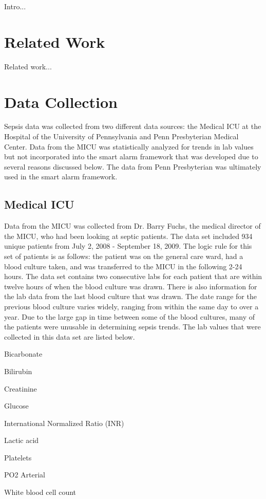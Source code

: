 \documentclass{sig-alternate}
\begin{document}
Intro...

\vspace{10pt}
\section{Related Work}
\vspace{10pt}
\label{sec:related_work}
Related work...

\vspace{10pt}
\section{Data Collection}
\vspace{10pt}
\label{sec:sys_model}

Sepsis data was collected from two different data sources: the Medical ICU at the Hospital of the University of Pennsylvania and Penn Presbyterian Medical Center.  Data from the MICU was statistically analyzed for trends in lab values but not incorporated into the smart alarm framework that was developed due to several reasons discussed below.  The data from Penn Presbyterian was ultimately used in the smart alarm framework.

\subsection{Medical ICU}
\label{subsec:micu}
\vspace{10pt}

Data from the MICU was collected from Dr. Barry Fuchs, the medical director of the MICU, who had been looking at septic patients.  The data set included 934 unique patients from July 2, 2008 - September 18, 2009.  The logic rule for this set of patients is as follows: the patient was on the general care ward, had a blood culture taken, and was transferred to the MICU in the following 2-24 hours.  The data set contains two consecutive labs for each patient that are within twelve hours of when the blood culture was drawn.  There is also information for the lab data from the last blood culture that was drawn.  The date range for the previous blood culture varies widely, ranging from within the same day to over a year.  Due to the large gap in time between some of the blood cultures, many of the patients were unusable in determining sepsis trends.  The lab values that were collected in this data set are listed below.
\begin{itemize*}
  \item Bicarbonate
  \item Bilirubin
  \item Creatinine
  \item Glucose
  \item International Normalized Ratio (INR)
  \item Lactic acid
  \item Platelets
  \item PO2 Arterial
  \item White blood cell count
\end{itemize*}
\end{document}
